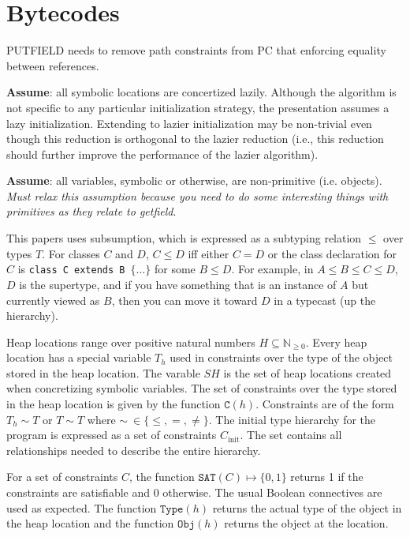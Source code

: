 \section{Bytecodes}

PUTFIELD needs to remove path constraints from PC that enforcing equality between references.

\noindent \textbf{Assume}: all symbolic locations are concertized lazily. Although the algorithm is not specific to any particular initialization strategy, the presentation assumes a lazy initialization. Extending to lazier initialization may be non-trivial even though this reduction is orthogonal to the lazier reduction (i.e., this reduction should further improve the performance of the lazier algorithm).

\noindent \textbf{Assume}: all variables, symbolic or otherwise, are non-primitive (i.e. objects). \textit{Must relax this assumption because you need to do some interesting things with primitives as they relate to getfield}.

This papers uses subsumption, which is expressed as a subtyping relation $\leq$ over types $T$. For classes $C$ and $D$, $C \leq D$ iff either $C = D$ or the class declaration for $C$ is \texttt{class C extends B $\{\ldots\}$} for some $B \leq D$. For example, in $A \leq B \leq C \leq D$, $D$ is the supertype, and if you have something that is an instance of $A$ but currently viewed as $B$, then you can move it toward $D$ in a typecast (up the hierarchy).

Heap locations range over positive natural numbers $H \subseteq \mathbb{N}_{\geq 0}$. Every heap location has a special variable $T_h$ used in constraints over the type of the object stored in the heap location. The varable $\mathit{SH}$ is the set of heap locations created when concretizing symbolic variables. The set of constraints over the type stored in the heap location is given by the function $\mathtt{C}(h)$. Constraints are of the form $T_h \sim T$ or $T \sim T$ where $\sim\ \in \{\leq, =, \not =\}$. The initial type hierarchy for the program is expressed as a set of constraints $C_\mathrm{init}$. The set contains all relationships needed to describe the entire hierarchy.

For a set of constraints $C$, the function $\mathtt{SAT}(C) \mapsto \{0,1\}$ returns 1 if the constraints are satisfiable and 0 otherwise. The usual Boolean connectives are used as expected. The function $\mathtt{Type}(h)$ returns the actual type of the object in the heap location and the function $\mathtt{Obj}(h)$ returns the object at the location.

